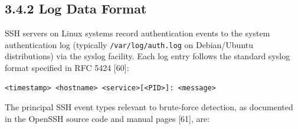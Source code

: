 \documentclass[
  a4paper]{report}
\begin{document}
\subsection{3.4.2 Log Data Format}\label{log-data-format}

SSH servers on Linux systems record authentication events to the system
authentication log (typically \texttt{/var/log/auth.log} on
Debian/Ubuntu distributions) via the syslog facility. Each log entry
follows the standard syslog format specified in RFC 5424 {[}60{]}:

\begin{verbatim}
<timestamp> <hostname> <service>[<PID>]: <message>
\end{verbatim}

The principal SSH event types relevant to brute-force detection, as
documented in the OpenSSH source code and manual pages {[}61{]}, are:
\end{document}
